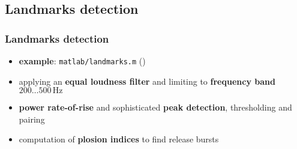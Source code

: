 
\subsection{Landmarks detection}

\begin{frame} %
	\frametitle{Landmarks detection}
	\begin{itemize}
		\item \textbf{example}: \texttt{matlab/landmarks.m} ()
		\item applying an \textbf{equal loudness filter} and limiting to \textbf{frequency band} $200\ldots500\,\textrm{Hz}$
			\begin{figure}
				\centering
				\begin{subfigure}[c]{0.40\linewidth}
				\end{subfigure}
				\hspace{0.01\linewidth}
				\begin{subfigure}[c]{0.40\linewidth}
				\end{subfigure}
			\end{figure}
		\item \textbf{power rate-of-rise} and sophisticated \textbf{peak detection}, thresholding and pairing
			\begin{figure}
				\centering
				\begin{subfigure}[c]{0.40\linewidth}
				\end{subfigure}
				\hspace{0.01\linewidth}
				\begin{subfigure}[c]{0.40\linewidth}
				\end{subfigure}
			\end{figure}
		\item computation of \textbf{plosion indices} to find release bursts
	\end{itemize}
\end{frame}

